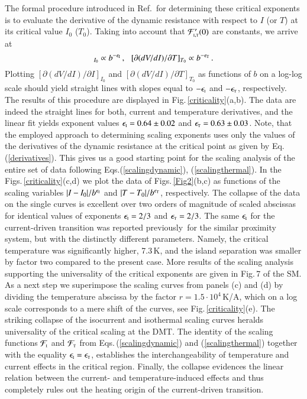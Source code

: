 \documentclass[aps,twocolumn,prl,10pt,amsmath,amssymb,nofootinbib,showpacs,superscriptaddress,floatfix]{revtex4-1}
\newcommand{\rs}{\rm\scriptscriptstyle}
\begin{document}
The formal procedure introduced in Ref.\,\cite{Hebard:1990} for determining these critical exponents is to evaluate the derivative of the dynamic resistance with respect to $I$ (or $T$) at its critical value $I_0$ ($T_0$).
Taking into account that ${\cal F}^\prime_{{\rs I},{\rs T}}(0)$ are constants, we arrive at 
\begin{equation}
[\partial(dV/dI)/\partial I]_{I_0}\propto b^{-\epsilon_{\rs I}}\,,\,\,\,\, [\partial(dV/dI)/\partial T]_{T_0}\propto b^{-\epsilon_{\rs T}}\,.
\label{derivatives}
\end{equation}
Plotting $[\partial(dV/dI)/\partial I]_{I_0}$ and $[\partial(dV/dI)/\partial T]_{T_0}$ as functions of $b$ on a log-log scale should yield straight lines with slopes equal to 
$-\epsilon_{\rs I}$ and $-\epsilon_{\rs T}$, respectively. The results of this procedure are displayed in Fig.\,\ref{criticality}(a,b).
The data are indeed the straight lines for both, current and temperature derivatives, and
the linear fit yields exponent values 
 $\epsilon_{\rs I} = 0.64 \pm 0.02$ and $\epsilon_{\rs T} = 0.63 \pm 0.03$.
Note, that the employed approach to determining scaling exponents uses only the values of the  
derivatives of the dynamic resistance at the critical point as given by Eq.\,(\ref{derivatives}).
This gives us a good starting point for the scaling analysis of the entire set of data
following Eqs.(\ref{scalingdynamic}), (\ref{scalingthermal}).
In the Figs.\,\ref{criticality}(c,d) we plot the data of Figs.\,\ref{Fig2}(b,c) as functions of the 
scaling variables $|I - I_0|/b^{\epsilon_{\rs I}}$ and $|T - T_0|/b^{\epsilon_{\rs T}}$, respectively. The collapse of the data on the single curves is excellent over two orders of magnitude of scaled abscissas for identical values of exponents
 $\epsilon_{\rs I}=2/3$ and $\epsilon_{\rs T}=2/3$. 
The same $\epsilon_{\rs I}$ for the current-driven transition was reported previously\,\cite{Science2015} for the similar proximity system, but with the distinctly different parameters. Namely, the critical temperature was significantly higher, 7.3\,K, and the island separation was smaller by factor two compared to the present case.
More results of the scaling analysis supporting the universality of the critical exponents are given in Fig.\,7 of the SM. As a next step we superimpose the scaling curves from panels (c) and (d) by
dividing the temperature abscissa by the factor $r=1.5\cdot 10^{4}$\,K/A, which on a log scale corresponds to a mere shift of the curves, see Fig.\,\ref{criticality}(e). 
The striking collapse of the isocurrent and isothermal scaling curves heralds universality of the critical scaling at the DMT.
The identity of the scaling functions 
${\cal F}_{\rs I}$ and ${\cal F}_{\rs T}$ from Eqs.\,(\ref{scalingdynamic}) and (\ref{scalingthermal}) together with the equality $\epsilon_{\rs I}=\epsilon_{\rs T}$, establishes the interchangeability of temperature and current effects in the critical region.
Finally, the collapse evidences the linear relation between the current- and temperature-induced effects and thus completely rules out the heating origin of the current-driven transition. 
\end{document}
